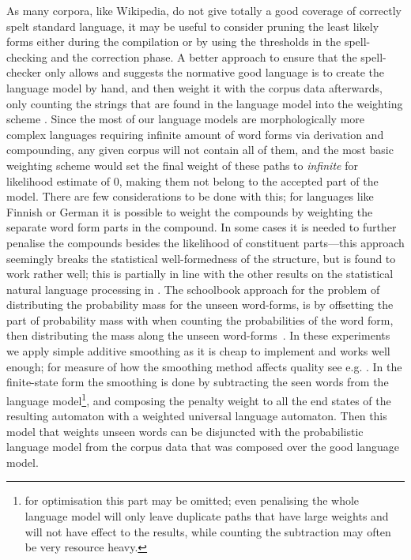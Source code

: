 \documentclass[a4paper,12pt]{article}
\begin{document}
As many corpora, like Wikipedia, do not give totally a good coverage of
correctly spelt standard language, it may be useful to consider pruning the
least likely forms either during the compilation or by using the thresholds in
the spell-checking and the correction phase. A better approach to ensure that
the spell-checker only allows and suggests the normative good language is to
create the language model by hand, and then weight it with the corpus data
afterwards, only counting the strings that are found in the language model into
the weighting scheme \cite[]{pirinen/2009/nodalida}. Since the most of our
language models are morphologically more complex languages requiring infinite
amount of word forms via derivation and compounding, any given corpus will not
contain all of them, and the most basic weighting scheme would set the final
weight of these paths to \emph{infinite} for likelihood estimate of 0, making
them not belong to the accepted part of the model. There are few considerations
to be done with this; for languages like Finnish or German
\cite[]{schiller2006german} it is possible to weight the compounds by weighting
the separate word form parts in the compound.  In some cases it is needed to
further penalise the compounds besides the likelihood of constituent
parts---this approach seemingly breaks the statistical well-formedness of the
structure, but is found to work rather well; this is partially in line with the
other results on the statistical natural language processing in
\cite{brants2007large}. The schoolbook approach for the problem of distributing
the probability mass for the unseen word-forms, is by offsetting the part of
probability mass with when counting the probabilities of the word form, then
distributing the mass along the unseen word-forms~\cite[for a good introduction
to smoothing models we refer to][]{jurafsky2000speech}. In these experiments we
apply simple additive smoothing as it is cheap to implement and works well
enough; for measure of how the smoothing method affects quality see e.g.
\cite{chen1999empirical}. In the finite-state form the smoothing is done by
subtracting the seen words from the language model\footnote{for optimisation
    this part may be omitted; even penalising the whole language model will
    only leave duplicate paths that have large weights and will not have effect
    to the results, while counting the subtraction may often be very resource
heavy.}, and composing the penalty weight to all the end states of the
resulting automaton with a weighted universal language automaton.  Then this
model that weights unseen words can be disjuncted with the probabilistic
language model from the corpus data that was composed over the good language
model.
\end{document}
